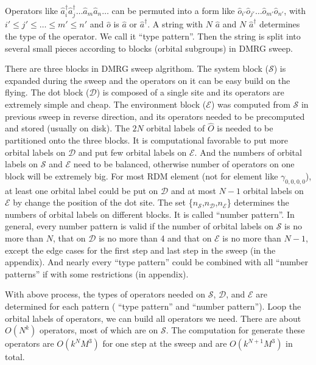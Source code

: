   Operators like $\hat{a}^\dagger_i\hat{a}^\dagger_j\dots \hat{a}_m\hat{a}_n\dots$ can be permuted into a form like $\hat{o}_{i'}\hat{o}_{j'}\dots \hat{o}_{m'}\hat{o}_{n'}$, with $i'\le j'\le \dots \le m' \le n'$ and $\hat{o}$ is $\hat{a}$ or $\hat{a}^\dagger$. A string with $N$ $\hat{a}$ and $N$ $\hat{a}^\dagger$ determines the type of the operator. 
We call it ``type pattern''. 
Then the string is split into several small pieces according to blocks (orbital subgroups) in DMRG sweep. 

There are three blocks in DMRG sweep algrithom.
The system block ($\mathcal{S}$) is expanded during the sweep and the operators on it can be easy build on the flying. The dot block ($\mathcal{D}$) is composed of a single site and its operators are extremely simple and cheap. The environment block ($\mathcal{E}$) was computed from $\mathcal{S}$ in previous sweep in reverse direction, and its operators needed to be precomputed and stored (usually on disk). 
The $2N$ orbital labels of $\hat{O}$ is needed to be partitioned onto the three blocks. It is computational favorable to put more orbital labels on $\mathcal{D}$ and put few orbital labels on $\mathcal{E}$. And the numbers of orbital labels on $\mathcal{S}$ and $\mathcal{E}$ need to be balanced, otherwise number of operators on one block will be extremely big. For most RDM element (not for element like $\gamma_{0,0,0,0}$), at least one orbital label could be put on $\mathcal{D}$ and at most $N-1$ orbital labels on $\mathcal{E}$ by change the position of the dot site. The set \{$n_\mathcal{S}$,$n_\mathcal{D}$,$n_\mathcal{E}$\} determines the numbers of orbital labels on different blocks. It is called ``number pattern''. In general, every number pattern is valid if the number of orbital labels on $\mathcal{S}$ is no more than $N$, that on $\mathcal{D}$ is no more than 4 and that on $\mathcal{E}$ is no more than $N-1$, except the edge cases for the first step and last step in the sweep (in the appendix).
And nearly every ``type pattern'' could be combined with all ``number patterns'' if with some restrictions (in appendix).   

With above process, the types of operators needed on $\mathcal{S}$, $\mathcal{D}$, and $\mathcal{E}$ are determined for each pattern ( ``type pattern'' and ``number pattern''). Loop the orbital labels of operators, we can build all operators we need. There are about $O(N^k)$ operators, most of which are on $\mathcal{S}$.
  The computation for generate these operators are $O(k^NM^3)$ for one step at the sweep and are $O(k^{N+1}M^3)$ in total.   



